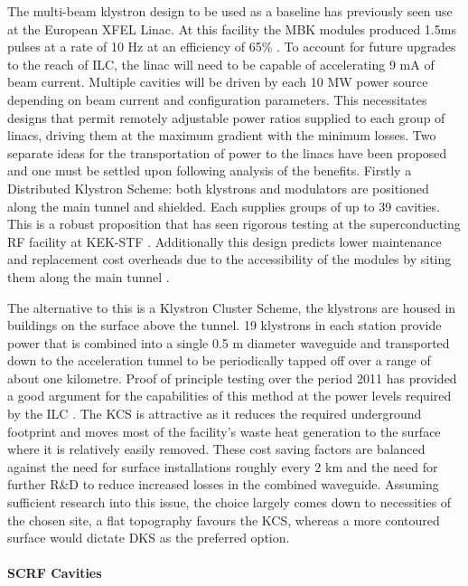 The multi-beam klystron design to be used as a baseline has previously seen use at the European XFEL Linac. At this facility the MBK modules produced 1.5ms pulses at a rate of 10 Hz at an efficiency of 65\% \cite{LINAC:KlystronsXFEL}. To account for future upgrades to the reach of ILC, the linac will need to be capable of accelerating 9 mA of beam current. Multiple cavities will be driven by each 10 MW power source depending on beam current and configuration parameters. This necessitates designs that permit remotely adjustable power ratios supplied to each group of linacs, driving them at the maximum gradient with the minimum losses.
Two separate ideas for the transportation of power to the linacs have been proposed and one must be settled upon following analysis of the benefits. Firstly a Distributed Klystron Scheme: both klystrons and modulators are positioned along the main tunnel and shielded. Each supplies groups of up to 39 cavities. This is a robust proposition that has seen rigorous testing at the superconducting RF facility at KEK-STF \cite{IPAC:DRFSTest}. Additionally this design predicts lower maintenance and replacement cost overheads due to the accessibility of the modules by siting them along the main tunnel \cite{LINAC:DRFS}.

The alternative to this is a Klystron Cluster Scheme, the klystrons are housed in buildings on the surface above the tunnel. 19 klystrons in each station provide power that is combined into a single 0.5 m diameter waveguide and transported down to the acceleration tunnel to be periodically tapped off over a range of about one kilometre. Proof of principle testing over the period 2011 has provided a good argument for the capabilities of this method at the power levels required by the ILC \cite{IPAC:Klystron}. The KCS is attractive as it reduces the required underground footprint and moves most of the facility's waste heat generation to the surface where it is relatively easily removed. These cost saving factors are balanced against the need for surface installations roughly every 2 km and the need for further R\&D to reduce increased losses in the combined waveguide. Assuming sufficient research into this issue, the choice largely comes down to necessities of the chosen site, a flat topography favours the KCS, whereas a more contoured surface would dictate DKS as the preferred option.

\paragraph{SCRF Cavities}

